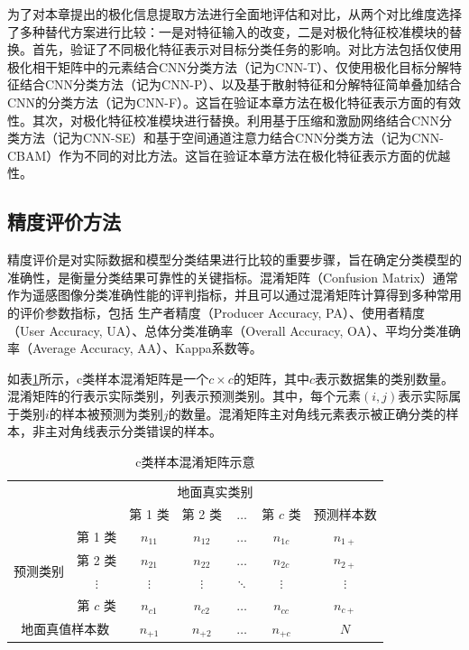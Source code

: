 为了对本章提出的极化信息提取方法进行全面地评估和对比，从两个对比维度选择了多种替代方案进行比较：一是对特征输入的改变，二是对极化特征校准模块的替换。首先，验证了不同极化特征表示对目标分类任务的影响。对比方法包括仅使用极化相干矩阵中的元素结合CNN分类方法（记为CNN-T）、仅使用极化目标分解特征结合CNN分类方法（记为CNN-P）、以及基于散射特征和分解特征简单叠加结合CNN的分类方法（记为CNN-F）。这旨在验证本章方法在极化特征表示方面的有效性。其次，对极化特征校准模块进行替换。利用基于压缩和激励网络结合CNN分类方法（记为CNN-SE）和基于空间通道注意力结合CNN分类方法（记为CNN-CBAM）作为不同的对比方法。这旨在验证本章方法在极化特征表示方面的优越性。

\subsection{精度评价方法}
精度评价是对实际数据和模型分类结果进行比较的重要步骤，旨在确定分类模型的准确性，是衡量分类结果可靠性的关键指标。混淆矩阵（Confusion Matrix）通常作为遥感图像分类准确性能的评判指标，并且可以通过混淆矩阵计算得到多种常用的评价参数指标，包括
生产者精度（Producer Accuracy, PA）、使用者精度（User Accuracy, UA）、总体分类准确率（Overall Accuracy, OA）、平均分类准确率（Average Accuracy, AA）、Kappa系数等。

如表\ref{tab:conf_示意表}所示，c类样本混淆矩阵是一个$c \times c$的矩阵，其中$c$表示数据集的类别数量。混淆矩阵的行表示实际类别，列表示预测类别。其中，每个元素$(i, j)$表示实际属于类别$i$的样本被预测为类别$j$的数量。混淆矩阵主对角线元素表示被正确分类的样本，非主对角线表示分类错误的样本。

\begin{table}[ht!]
    \caption{c类样本混淆矩阵示意}
    \label{tab:conf_示意表}
    \centering
    \begin{tabular}{ccccccc}
        \hline
                                    &          & \multicolumn{4}{c}{地面真实类别} &                                           \\
        \cline{3-6}
                                    &          & 第 1 类                      & 第 2 类    & $\ldots$ & 第 $c$ 类  & 预测样本数    \\
        \multirow{4}{*}{预测类别}       & 第 1 类    & $n_{11}$                   & $n_{12}$ & $\ldots$ & $n_{1c}$ & $n_{1+}$ \\
                                    & 第 2 类    & $n_{21}$                   & $n_{22}$ & $\ldots$ & $n_{2c}$ & $n_{2+}$ \\
                                    & $\vdots$ & $\vdots$                   & $\vdots$ & $\ddots$ & $\vdots$ & $\vdots$ \\
                                    & 第 $c$ 类  & $n_{c1}$                   & $n_{c2}$ & $\ldots$ & $n_{cc}$ & $n_{c+}$ \\
        \multicolumn{2}{c}{地面真值样本数} & $n_{+1}$ & $n_{+2}$                   & $\ldots$ & $n_{+c}$ & $N$                 \\
        \hline
    \end{tabular}
\end{table}

